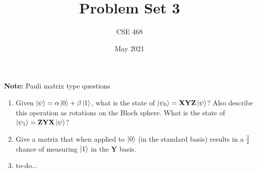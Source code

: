 \documentclass[12pt]{article}
\title{Problem Set 3}
\author{CSE 468}
\date{May 2021}
\begin{document}
\maketitle

\noindent \textbf{Note:} Pauli matrix type questions

\begin{enumerate}[font=\bfseries]
    \item Given $\ket{\psi} = \alpha\ket{0} + \beta\ket{1}$, what is the state of $\ket{\psi_0} = \mathbf{X}\mathbf{Y}\mathbf{Z}\ket{\psi}$? Also describe this operation as rotations on the Bloch sphere. What is the state of $\ket{\psi_1} = \mathbf{Z}\mathbf{Y}\mathbf{X}\ket{\psi}$?
    \item Give a matrix that when applied to $\ket{0}$ (in the standard basis) results in a $\frac{3}{4}$ chance of measuring $\ket{1}$ in the $\mathbf{Y}$ basis. 
    \item to-do...
\end{enumerate}
\end{document}
